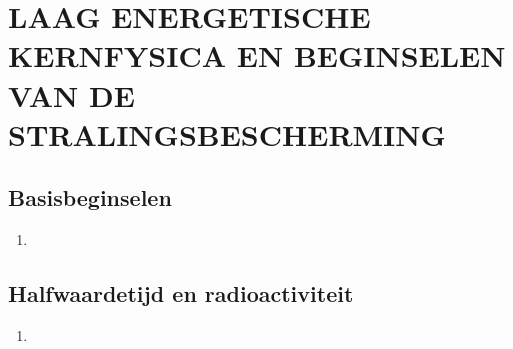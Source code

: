 \documentclass[12pt]{article}
\begin{document}
    \section{LAAG ENERGETISCHE KERNFYSICA EN BEGINSELEN VAN DE STRALINGSBESCHERMING}
    \subsection{Basisbeginselen}
    \begin{enumerate}
        \item 
    \end{enumerate}
    \subsection{Halfwaardetijd en radioactiviteit}
    \begin{enumerate}
        \item 
    \end{enumerate}
\end{document}
